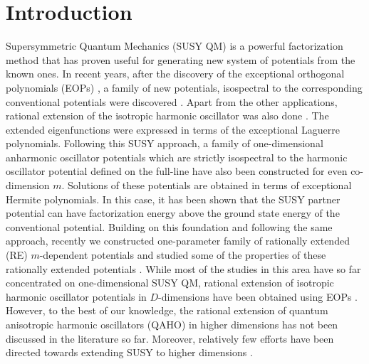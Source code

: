 \documentclass[12pt]{article}
\numberwithin{equation}{section} %
\begin{document}
\section{Introduction}
Supersymmetric Quantum Mechanics (SUSY QM) \cite{infeld1951factorization, gendenshtein1983derivation, cooper1983aspects, cooper1995supersymmetry, fellows2009factorization, mielnik1984factorization, hussin1998simple} is a powerful factorization method that has proven useful for generating new system of potentials from the known ones. In recent years, after the discovery of the exceptional orthogonal polynomials (EOPs) \cite{gomez2010extension, gomez2009extended}, a family of new potentials, isospectral to the corresponding conventional potentials were discovered \cite{quesne2008exceptional, odake2009infinitely, odake2010another, odake2013krein, yadav2013scattering, yadav2015scattering, yadav2015group, yadav2016parametric, grandati2012rational}. Apart from the other applications, rational extension of the isotropic harmonic oscillator was also done \cite{grandati2012rational}. The  extended eigenfunctions were expressed in terms of the exceptional Laguerre polynomials. Following this SUSY approach, a family of one-dimensional anharmonic oscillator potentials \cite{marquette2013two} which are strictly isospectral to the harmonic oscillator potential defined on the full-line have also been constructed for even co-dimension \(m\). Solutions of these potentials are obtained in terms of exceptional Hermite polynomials. In this case, it has been shown that the SUSY partner potential can have factorization energy above the ground state energy of the conventional potential. Building on this foundation and following the same approach, recently we constructed one-parameter family of rationally extended (RE) $m$-dependent potentials and studied some of the properties of these rationally extended potentials \cite{kumar2024rationally}.
While most of the studies in this area have so far concentrated on one-dimensional SUSY QM, rational extension of isotropic harmonic oscillator potentials in $D$-dimensions have been obtained using EOPs \cite{yadava2017rationally}. However, to the best of our knowledge, the rational extension of quantum anisotropic harmonic oscillators (QAHO) in higher dimensions has not been discussed in the literature so far. Moreover, relatively few efforts have been directed towards extending SUSY to higher dimensions \cite{clark1984non, de1983supersymmetric, andrianov1984factorization, khare1984supersymmetric, sukumar1985supersymmetry, leblanc1992extended, das1997higher}.
\end{document}
